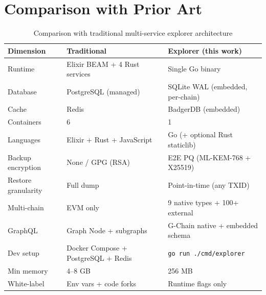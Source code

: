 \section{Comparison with Prior Art}


\begin{table}[H]
\centering
\begin{tabularx}{\textwidth}{lXX}
\toprule
\textbf{Dimension} & \textbf{Traditional} & \textbf{Explorer (this work)} \\
\midrule
Runtime & Elixir BEAM + 4 Rust services & Single Go binary \\
Database & PostgreSQL (managed) & SQLite WAL (embedded, per-chain) \\
Cache & Redis & BadgerDB (embedded) \\
Containers & 6 & 1 \\
Languages & Elixir + Rust + JavaScript & Go (+ optional Rust staticlib) \\
Backup encryption & None / GPG (RSA) & E2E PQ (ML-KEM-768 + X25519) \\
Restore granularity & Full dump & Point-in-time (any TXID) \\
Multi-chain & EVM only & 9 native types + 100+ external \\
GraphQL & Graph Node + subgraphs & G-Chain native + embedded schema \\
Dev setup & Docker Compose + PostgreSQL + Redis & \texttt{go run ./cmd/explorer} \\
Min memory & 4--8 GB & 256 MB \\
White-label & Env vars + code forks & Runtime flags only \\
\bottomrule
\end{tabularx}
\caption{Comparison with traditional multi-service explorer architecture}
\end{table}

